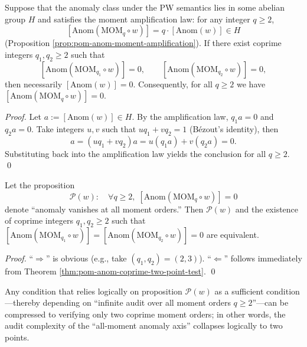\begin{theorem}\label{thm:pom-anom-coprime-two-point-test}
Suppose that the anomaly class under the PW semantics lies in some abelian group \(H\) and satisfies the moment amplification law: for any integer \(q\ge 2\),
\[
[\mathrm{Anom}(\mathrm{MOM}_q\circ w)]=q\cdot[\mathrm{Anom}(w)]\in H
\]
(Proposition \ref{prop:pom-anom-moment-amplification}).
If there exist coprime integers \(q_1,q_2\ge 2\) such that
\[
[\mathrm{Anom}(\mathrm{MOM}_{q_1}\circ w)]=0,\qquad
[\mathrm{Anom}(\mathrm{MOM}_{q_2}\circ w)]=0,
\]
then necessarily \([\mathrm{Anom}(w)]=0\).
Consequently, for all \(q\ge 2\) we have \([\mathrm{Anom}(\mathrm{MOM}_{q}\circ w)]=0\).
\end{theorem}
\begin{proof}
Let \(a:=[\mathrm{Anom}(w)]\in H\). By the amplification law, \(q_1 a=0\) and \(q_2 a=0\).
Take integers \(u,v\) such that \(u q_1+v q_2=1\) (B\'ezout's identity), then
\[
a=(u q_1+v q_2)a=u(q_1 a)+v(q_2 a)=0.
\]
Substituting back into the amplification law yields the conclusion for all \(q\ge 2\). \qed
\end{proof}

\begin{theorem}\label{thm:pom-anom-all-moments-collapse-to-two}
Let the proposition
\[
\mathcal P(w):\quad \forall q\ge 2,\;[\mathrm{Anom}(\mathrm{MOM}_q\circ w)]=0
\]
denote ``anomaly vanishes at all moment orders.''
Then \(\mathcal P(w)\) and the existence of coprime integers \(q_1,q_2\ge 2\) such that
\(
[\mathrm{Anom}(\mathrm{MOM}_{q_1}\circ w)]=[\mathrm{Anom}(\mathrm{MOM}_{q_2}\circ w)]=0
\)
are equivalent.
\end{theorem}
\begin{proof}
``\(\Rightarrow\)'' is obvious (e.g., take \((q_1,q_2)=(2,3)\)).
``\(\Leftarrow\)'' follows immediately from Theorem \ref{thm:pom-anom-coprime-two-point-test}. \qed
\end{proof}

\begin{corollary}\label{cor:pom-anom-oracle-collapse-two-point-trigger}
Any condition that relies logically on proposition \(\mathcal P(w)\) as a sufficient condition—thereby depending on ``infinite audit over all moment orders \(q\ge 2\)''—can be compressed to verifying only two coprime moment orders;
in other words, the audit complexity of the ``all-moment anomaly axis'' collapses logically to two points.
\end{corollary}

